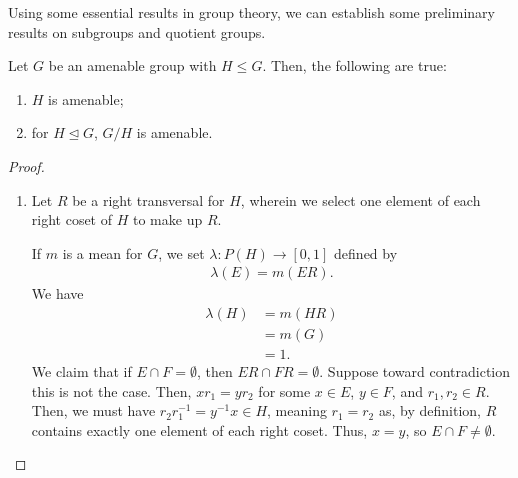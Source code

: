 Using some essential results in group theory, we can establish some preliminary results on subgroups and quotient groups.
\begin{proposition}\label{prop:subgroups_quotientgroups_amenability}
  Let $G$ be an amenable group with $H\leq G$. Then, the following are true:
  \begin{enumerate}[(1)]
    \item $H$ is amenable;
    \item for $H\trianglelefteq G$, $G/H$ is amenable.
  \end{enumerate}
\end{proposition}
\begin{proof}\hfill
  \begin{enumerate}[(1)]
    \item Let $R$ be a right transversal for $H$, wherein we select one element of each right coset of $H$ to make up $R$.\newline

      If $m$ is a mean for $G$, we set $\lambda\colon P(H)\rightarrow [0,1]$ defined by
      \begin{align*}
        \lambda(E) = m\left(ER\right).
      \end{align*}
       We have
      \begin{align*}
        \lambda(H) &= m\left(HR\right)\\
                   &= m\left(G\right)\\
                   &= 1.
      \end{align*}
      We claim that if $E\cap F = \emptyset$, then $ER \cap FR = \emptyset$. Suppose toward contradiction this is not the case. Then, $xr_1 = yr_2$ for some $x\in E$, $y\in F$, and $r_1,r_2\in R$. Then, we must have $r_2r_1^{-1} = y^{-1}x \in H$, meaning $r_1 = r_2$ as, by definition, $R$ contains exactly one element of each right coset. Thus, $x=y$, so $E\cap F \neq \emptyset$.\newline


\end{enumerate}
\end{proof}
